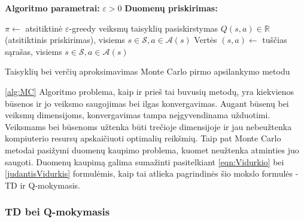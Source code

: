 \documentclass[a4paper, 12pt]{article}
\begin{document}
\begin{algorithm}[H]
 \label{alg:MC}
\SetAlgoLined
\DontPrintSemicolon
\textbf{Algoritmo parametrai:}\; 
$\varepsilon>0$\;
\textbf{Duomenų priskirimas:}\;

	$\pi \leftarrow$ atsitiktinė $\varepsilon$-greedy veiksmų taisyklių pasiskirstymas\;
	$Q(s, a) \in \mathbb{R}$ (atsitiktinis priskirimas), visiems $s \in \mathcal{S}, a \in \mathcal{A}(s)$\;
	Vertės $(s, a) \leftarrow$ tuščias sąrašas, visiems $s \in \mathcal{S}, a \in \mathcal{A}(s)$\;
	


\caption{Taisyklių bei verčių aproksimavimas Monte Carlo pirmo apsilankymo metodu}
\end{algorithm}

\ref{alg:MC} Algoritmo problema, kaip ir prieš tai buvusių metodų, yra kiekvienos būsenos ir jo veiksmo saugojimas bei ilgas konvergavimas. Augant būsenų bei veiksmų dimensijoms, konvergavimas tampa neįgyvendinama užduotimi. Veiksmams bei būsenoms užtenka būti trečioje dimensijoje ir jau nebeužtenka kompiuterio resursų apskaičiuoti optimalių reikšmių. Taip pat Monte Carlo metodai pasižymi duomenų kaupimo problema, kuomet neužtenka atminties juo saugoti. Duomenų kaupimą galima sumažinti pasitelkiant \ref{eqn:Vidurkio} bei \ref{judantisVidurkis} formulėmis, kaip tai atlieka pagrindinės šio mokslo formulės - TD ir Q-mokymasis.

\subsubsection{TD bei Q-mokymasis}
\end{document}
